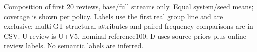 Composition of first 20 reviews, base/full streams only. Equal system/seed means; coverage is shown per policy. Labels use the first real group line and are exclusive; multi-GT structural attributes and paired frequency comparisons are in CSV. U review is U+V5, nominal reference100; D uses source priors plus online review labels. No semantic labels are inferred.
